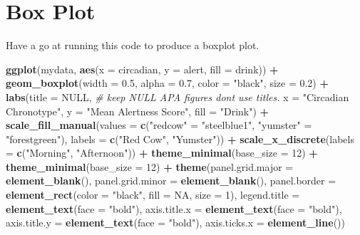 \documentclass[
]{book}
\newenvironment{Shaded}{\begin{snugshade}}{\end{snugshade}}
\newcommand{\AttributeTok}[1]{\textcolor[rgb]{0.13,0.29,0.53}{#1}}
\newcommand{\CommentTok}[1]{\textcolor[rgb]{0.56,0.35,0.01}{\textit{#1}}}
\newcommand{\ConstantTok}[1]{\textcolor[rgb]{0.56,0.35,0.01}{#1}}
\newcommand{\DecValTok}[1]{\textcolor[rgb]{0.00,0.00,0.81}{#1}}
\newcommand{\FloatTok}[1]{\textcolor[rgb]{0.00,0.00,0.81}{#1}}
\newcommand{\FunctionTok}[1]{\textcolor[rgb]{0.13,0.29,0.53}{\textbf{#1}}}
\newcommand{\NormalTok}[1]{#1}
\newcommand{\OtherTok}[1]{\textcolor[rgb]{0.56,0.35,0.01}{#1}}
\newcommand{\SpecialCharTok}[1]{\textcolor[rgb]{0.81,0.36,0.00}{\textbf{#1}}}
\newcommand{\StringTok}[1]{\textcolor[rgb]{0.31,0.60,0.02}{#1}}
\let\oldsection\section
\renewcommand{\section}{\needspace{5\baselineskip}\oldsection}
\begin{document}
\section{Box Plot}\label{box-plot}

Have a go at running this code to produce a boxplot plot.

\begin{Shaded}
\begin{Highlighting}[]
\FunctionTok{ggplot}\NormalTok{(mydata, }\FunctionTok{aes}\NormalTok{(}\AttributeTok{x =}\NormalTok{ circadian, }\AttributeTok{y =}\NormalTok{ alert, }\AttributeTok{fill =}\NormalTok{ drink)) }\SpecialCharTok{+}
  \FunctionTok{geom\_boxplot}\NormalTok{(}\AttributeTok{width =} \FloatTok{0.5}\NormalTok{, }\AttributeTok{alpha =} \FloatTok{0.7}\NormalTok{, }\AttributeTok{color =} \StringTok{"black"}\NormalTok{, }\AttributeTok{size =} \FloatTok{0.2}\NormalTok{) }\SpecialCharTok{+}
  \FunctionTok{labs}\NormalTok{(}\AttributeTok{title =} \ConstantTok{NULL}\NormalTok{,   }\CommentTok{\# keep NULL APA figures don\textquotesingle{}t use titles.}
       \AttributeTok{x =} \StringTok{"Circadian Chronotype"}\NormalTok{,  }
       \AttributeTok{y =} \StringTok{"Mean Alertness Score"}\NormalTok{,}
       \AttributeTok{fill =} \StringTok{"Drink"}\NormalTok{) }\SpecialCharTok{+}
  \FunctionTok{scale\_fill\_manual}\NormalTok{(}\AttributeTok{values =} \FunctionTok{c}\NormalTok{(}\StringTok{"redcow"} \OtherTok{=} \StringTok{"steelblue1"}\NormalTok{, }\StringTok{"yumster"} \OtherTok{=} \StringTok{"forestgreen"}\NormalTok{), }
                    \AttributeTok{labels =} \FunctionTok{c}\NormalTok{(}\StringTok{"Red Cow"}\NormalTok{, }\StringTok{"Yumster"}\NormalTok{)) }\SpecialCharTok{+}
  \FunctionTok{scale\_x\_discrete}\NormalTok{(}\AttributeTok{labels =} \FunctionTok{c}\NormalTok{(}\StringTok{"Morning"}\NormalTok{, }\StringTok{"Afternoon"}\NormalTok{)) }\SpecialCharTok{+}
  \FunctionTok{theme\_minimal}\NormalTok{(}\AttributeTok{base\_size =} \DecValTok{12}\NormalTok{) }\SpecialCharTok{+}
  \FunctionTok{theme\_minimal}\NormalTok{(}\AttributeTok{base\_size =} \DecValTok{12}\NormalTok{) }\SpecialCharTok{+}
  \FunctionTok{theme}\NormalTok{(}\AttributeTok{panel.grid.major =} \FunctionTok{element\_blank}\NormalTok{(),}
        \AttributeTok{panel.grid.minor =} \FunctionTok{element\_blank}\NormalTok{(),}
        \AttributeTok{panel.border =} \FunctionTok{element\_rect}\NormalTok{(}\AttributeTok{color =} \StringTok{"black"}\NormalTok{, }\AttributeTok{fill =} \ConstantTok{NA}\NormalTok{, }\AttributeTok{size =} \DecValTok{1}\NormalTok{),}
        \AttributeTok{legend.title =} \FunctionTok{element\_text}\NormalTok{(}\AttributeTok{face =} \StringTok{"bold"}\NormalTok{),}
        \AttributeTok{axis.title.x =} \FunctionTok{element\_text}\NormalTok{(}\AttributeTok{face =} \StringTok{"bold"}\NormalTok{),}
        \AttributeTok{axis.title.y =} \FunctionTok{element\_text}\NormalTok{(}\AttributeTok{face =} \StringTok{"bold"}\NormalTok{),}
        \AttributeTok{axis.ticks.x =} \FunctionTok{element\_line}\NormalTok{())}
\end{Highlighting}
\end{Shaded}
\end{document}
